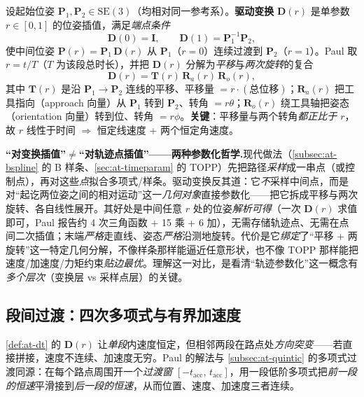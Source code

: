 \begin{definition}[驱动变换]\label{def:at-dt}
设起始位姿 $\mathbf P_1,\mathbf P_2\in\mathrm{SE}(3)$（均相对同一参考系）。\textbf{驱动变换} $\mathbf D(r)$ 是单参数 $r\in[0,1]$ 的位姿插值，满足\emph{端点条件}
\begin{equation}
  \mathbf D(0)=\mathbf I,\qquad \mathbf D(1)=\mathbf P_1^{-1}\mathbf P_2,
  \label{eq:at-dt-ends}
\end{equation}
使中间位姿 $\mathbf P(r)=\mathbf P_1\,\mathbf D(r)$ 从 $\mathbf P_1$（$r{=}0$）连续过渡到 $\mathbf P_2$（$r{=}1$）。Paul 取 $r=t/T$（$T$ 为该段总时长），并把 $\mathbf D(r)$ 分解为\emph{平移}与\emph{两次旋转}的复合
\begin{equation}
  \mathbf D(r)=\mathbf T(r)\,\mathbf R_a(r)\,\mathbf R_o(r),
  \label{eq:at-dt-decomp}
\end{equation}
其中 $\mathbf T(r)$ 是沿 $\mathbf P_1\to\mathbf P_2$ 连线的平移、平移量 $=r\cdot(\text{总位移})$；$\mathbf R_a(r)$ 把工具指向（approach 向量）从 $\mathbf P_1$ 转到 $\mathbf P_2$、转角 $=r\theta$；$\mathbf R_o(r)$ 绕工具轴把姿态（orientation 向量）转到位、转角 $=r\phi$。\textbf{关键}：平移量与两个转角\emph{都正比于 $r$}，故 $r$ 线性于时间 $\Rightarrow$ 恒定线速度 + 两个恒定角速度。
\end{definition}

\begin{insight}
\textbf{“对变换插值”$\ne$“对轨迹点插值”——两种参数化哲学.}\;现代做法（\cref{subsec:at-bspline} 的 B 样条、\cref{sec:at-timeparam} 的 TOPP）先把路径\emph{采样}成一串点（或控制点），再对这些\emph{点}拟合多项式/样条。驱动变换反其道：它\emph{不}采样中间点，而是对“起讫两位姿之间的相对运动”这一\emph{几何对象}直接参数化——把它拆成平移与两次旋转、各自线性展开。其好处是中间任意 $r$ 处的位姿\emph{解析可得}（一次 $\mathbf D(r)$ 求值即可，Paul 报告约 4 次三角函数 + 15 乘 + 6 加），无需存储轨迹点、无需在点间二次插值；末端\emph{严格}走直线、姿态\emph{严格}沿测地旋转。代价是它\emph{绑定}了“平移 + 两旋转”这一特定几何分解，不像样条那样能逼近任意形状，也不像 TOPP 那样能把速度/加速度/力矩约束\emph{贴边最优}。理解这一对比，是看清“轨迹参数化”这一概念有\emph{多个层次}（变换层 vs 采样点层）的关键。
\end{insight}

\subsection{段间过渡：四次多项式与有界加速度}
\label{subsec:at-dt-transition}

\cref{def:at-dt} 的 $\mathbf D(r)$ 让\emph{单段}内速度恒定，但相邻两段在路点处\emph{方向突变}——若直接拼接，速度不连续、加速度无穷。Paul 的解法与 \cref{subsec:at-quintic} 的多项式过渡同源：在每个路点周围开一个\emph{过渡窗} $[-t_{\mathrm{acc}},\,t_{\mathrm{acc}}]$，用一段低阶多项式把\emph{前一段的恒速}平滑接到\emph{后一段的恒速}，从而位置、速度、加速度三者连续。

